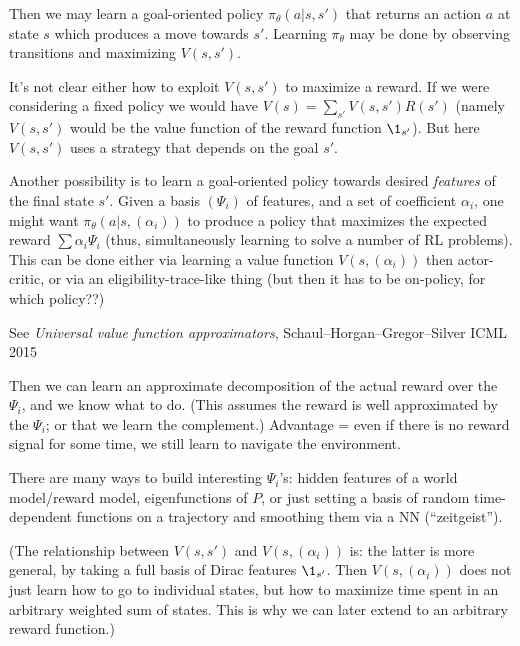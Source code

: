 \documentclass[11pt,a4paper]{article}
\begin{document}
Then we may learn a goal-oriented policy $\pi_\theta(a|s,s')$ that returns an
action $a$ at state $s$ which produces a move towards $s'$. Learning
$\pi_\theta$ may be done by observing transitions and maximizing
$V(s,s')$.

It's not clear either how to exploit $V(s,s')$ to maximize a reward. If
we were considering a fixed policy we would have
$V(s)=\sum_{s'}V(s,s')R(s')$ (namely $V(s,s')$ would be the value
function of the reward function $\1_{s'}$). But here $V(s,s')$ uses a
strategy that depends on the goal $s'$.

Another possibility is to learn a goal-oriented policy towards desired
\emph{features} of the final state $s'$. Given a basis $(\Psi_i)$ of
features, and a set of coefficient $\alpha_i$, one might want
$\pi_\theta(a|s,(\alpha_i))$ to produce a policy that maximizes the
expected reward $\sum \alpha_i \Psi_i$ (thus, simultaneously learning to
solve a number of RL problems). 
This can be done either via learning a value function $V(s,(\alpha_i))$
then actor-critic, or via an eligibility-trace-like thing (but then it
has to be on-policy, for which policy??)

See \emph{Universal value function approximators},
Schaul--Horgan--Gregor--Silver ICML 2015

Then we can learn an approximate decomposition of the actual reward over
the $\Psi_i$, and we know what to do. (This assumes the reward is well
approximated by the $\Psi_i$; or that we learn the complement.) Advantage
= even if there is no reward signal for some time, we still learn to
navigate the environment.

There are many ways to build interesting
$\Psi_i$'s: hidden features of a world model/reward model, eigenfunctions
of $P$, or just setting a basis of random time-dependent functions on a
trajectory and smoothing them via a NN (``zeitgeist'').

(The relationship between $V(s,s')$ and $V(s,(\alpha_i))$ is: the latter
is more general, by taking a full basis of Dirac features $\1_{s'}$. Then
$V(s,(\alpha_i))$ does not just learn how to go to individual states, but
how to maximize time spent in an arbitrary weighted sum of states. This
is why we can later extend to an arbitrary reward function.)
\end{document}
